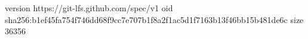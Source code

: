 version https://git-lfs.github.com/spec/v1
oid sha256:b1ef45fa754f746dd68f9cc7e707b1f8a2f1ac5d1f7163b13f46bb15b481de6c
size 36356
